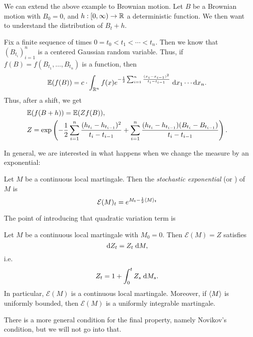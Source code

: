\documentclass[a4paper]{article}
\begin{document}
\begin{eg}
  We can extend the above example to Brownian motion. Let $B$ be a Brownian motion with $B_0 = 0$, and $h: [0, \infty) \to \mathbb{R}$ a deterministic function. We then want to understand the distribution of $B_t + h$.

  Fix a finite sequence of times $0 = t_0 < t_1 < \cdots < t_n$. Then we know that $(B_{t_i})_{i = 1}^n$ is a centered Gaussian random variable. Thus, if $f(B) = f(B_{t_1}, \ldots, B_{t_n})$ is a function, then
  \[
    \mathbb{E} (f(B)) = c \cdot \int_{\mathbb{R}^n} f(x) e^{-\frac{1}{2} \sum_{i = 1}^n \frac{(x_i - x_{i - 1})^2}{t_i - t_{i - 1}}}\;\mathrm{d} x_1 \cdots \mathrm{d} x_n.
  \]
  Thus, after a shift, we get
  \begin{align*}
    &\mathbb{E} (f (B + h)) = \mathbb{E} (Z f(B)),\\
    &Z = \exp \left(-\frac{1}{2} \sum_{i = 1}^n \frac{(h_{t_i} - h_{t_{i - 1}})^2}{t_i - t_{i - 1}} + \sum_{i = 1}^n \frac{(h_{t_i} - h_{t_{i - 1}})(B_{t_i} - B_{t_{i - 1}})}{t_i - t_{i - 1}}\right).
  \end{align*}
\end{eg}
In general, we are interested in what happens when we change the measure by an exponential:
\begin{defi}
  Let $M$ be a continuous local martingale. Then the \emph{stochastic exponential} (or ) of $M$ is
  \[
    \mathcal{E}(M)_t = e^{M_t - \frac{1}{2} \langle M\rangle_t}
  \]
\end{defi}
The point of introducing that quadratic variation term is
\begin{prop}
  Let $M$ be a continuous local martingale with $M_0 = 0$. Then $\mathcal{E}(M) = Z$ satisfies
  \[
    \mathrm{d} Z_t = Z_t \;\mathrm{d} M,
  \]
  i.e.
  \[
    Z_t = 1 + \int_0^t Z_s \;\mathrm{d} M_s.
  \]
  In particular, $\mathcal{E}(M)$ is a continuous local martingale. Moreover, if $\langle M\rangle$ is uniformly bounded, then $\mathcal{E}(M)$ is a uniformly integrable martingale.
\end{prop}
There is a more general condition for the final property, namely Novikov's condition, but we will not go into that.
\end{document}
